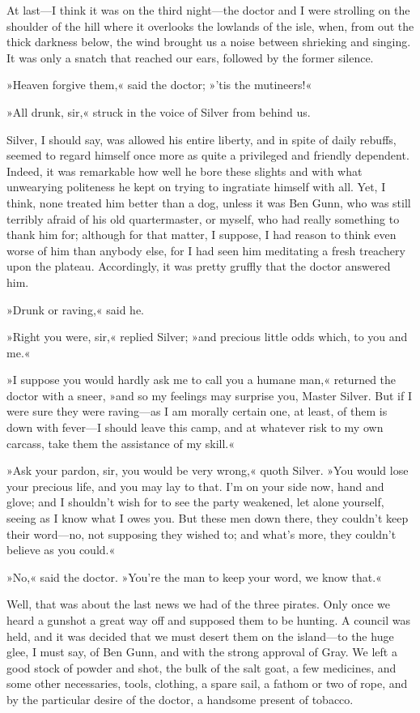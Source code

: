 At last—I think it was on the third night—the doctor and I were strolling on the shoulder of the hill where it overlooks the lowlands of the isle, when, from out the thick darkness below, the wind brought us a noise between shrieking and singing. It was only a snatch that reached our ears, followed by the former silence.

»Heaven forgive them,« said the doctor; »'tis the mutineers!«

»All drunk, sir,« struck in the voice of Silver from behind us.

Silver, I should say, was allowed his entire liberty, and in spite of daily rebuffs, seemed to regard himself once more as quite a privileged and friendly dependent. Indeed, it was remarkable how well he bore these slights and with what unwearying politeness he kept on trying to ingratiate himself with all. Yet, I think, none treated him better than a dog, unless it was Ben Gunn, who was still terribly afraid of his old quartermaster, or myself, who had really something to thank him for; although for that matter, I suppose, I had reason to think even worse of him than anybody else, for I had seen him meditating a fresh treachery upon the plateau. Accordingly, it was pretty gruffly that the doctor answered him.

»Drunk or raving,« said he.

»Right you were, sir,« replied Silver; »and precious little odds which, to you and me.«

»I suppose you would hardly ask me to call you a humane man,« returned the doctor with a sneer, »and so my feelings may surprise you, Master Silver. But if I were sure they were raving—as I am morally certain one, at least, of them is down with fever—I should leave this camp, and at whatever risk to my own carcass, take them the assistance of my skill.«

»Ask your pardon, sir, you would be very wrong,« quoth Silver. »You would lose your precious life, and you may lay to that. I'm on your side now, hand and glove; and I shouldn't wish for to see the party weakened, let alone yourself, seeing as I know what I owes you. But these men down there, they couldn't keep their word—no, not supposing they wished to; and what's more, they couldn't believe as you could.«

»No,« said the doctor. »You're the man to keep your word, we know that.«

Well, that was about the last news we had of the three pirates. Only once we heard a gunshot a great way off and supposed them to be hunting. A council was held, and it was decided that we must desert them on the island—to the huge glee, I must say, of Ben Gunn, and with the strong approval of Gray. We left a good stock of powder and shot, the bulk of the salt goat, a few medicines, and some other necessaries, tools, clothing, a spare sail, a fathom or two of rope, and by the particular desire of the doctor, a handsome present of tobacco.

